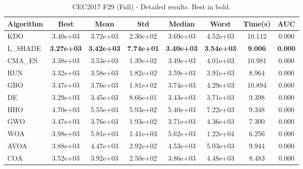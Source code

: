 \begin{table}[H]
\centering\small
\caption{CEC2017 F29 (Full) - Detailed results. Best in bold.}
\label{tab:cec2017_F29}
\begin{tabular}{lccccccc}
\toprule
\textbf{Algorithm} & \textbf{Best} & \textbf{Mean} & \textbf{Std} & \textbf{Median} & \textbf{Worst} & \textbf{Time(s)} & \textbf{AUC} \\
\midrule
KDO & 3.40e+03 & 3.72e+03 & 2.30e+02 & 3.69e+03 & 4.52e+03 & 10.112 & 0.000 \\
L_SHADE & \textbf{3.27e+03} & \textbf{3.42e+03} & \textbf{7.74e+01} & \textbf{3.40e+03} & \textbf{3.54e+03} & \textbf{9.006} & \textbf{0.000} \\
CMA_ES & 3.38e+03 & 3.53e+03 & 1.39e+02 & 3.49e+03 & 4.01e+03 & 10.981 & 0.000 \\
RUN & 3.32e+03 & 3.58e+03 & 1.82e+02 & 3.59e+03 & 3.91e+03 & 8.964 & 0.000 \\
GBO & 3.47e+03 & 3.76e+03 & 1.81e+02 & 3.74e+03 & 4.29e+03 & 10.894 & 0.000 \\
DE & 3.29e+03 & 3.45e+03 & 8.66e+01 & 3.43e+03 & 3.71e+03 & 9.398 & 0.000 \\
HHO & 4.70e+03 & 5.55e+03 & 5.93e+02 & 5.40e+03 & 7.22e+03 & 9.348 & 0.000 \\
GWO & 3.47e+03 & 3.76e+03 & 1.93e+02 & 3.71e+03 & 4.36e+03 & 7.300 & 0.000 \\
WOA & 3.98e+03 & 5.81e+03 & 1.41e+03 & 5.62e+03 & 1.22e+04 & 6.256 & 0.000 \\
AVOA & 3.88e+03 & 4.47e+03 & 2.92e+02 & 4.53e+03 & 5.03e+03 & 9.944 & 0.000 \\
COA & 3.52e+03 & 3.92e+03 & 2.50e+02 & 3.86e+03 & 4.48e+03 & 8.483 & 0.000 \\
\bottomrule
\end{tabular}
\end{table}
